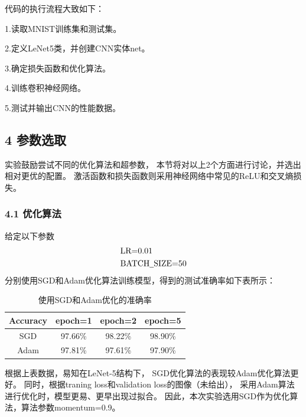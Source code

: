 \documentclass[a4paper,utf8]{article}
\begin{document}
	代码的执行流程大致如下：

	1.读取MNIST训练集和测试集。

	2.定义LeNet5类，并创建CNN实体net。

	3.确定损失函数和优化算法。

	4.训练卷积神经网络。

	5.测试并输出CNN的性能数据。


	\subsection*{4 参数选取}
	实验鼓励尝试不同的优化算法和超参数，
	本节将对以上2个方面进行讨论，并选出相对更优的配置。
	激活函数和损失函数则采用神经网络中常见的ReLU和交叉熵损失。

	\subsubsection*{4.1 优化算法}
	给定以下参数
	\begin{align*}
		& \text{LR=0.01} \\
		& \text{BATCH\underline{\hspace{0.5em}}SIZE=50}
	\end{align*}
	分别使用SGD和Adam优化算法训练模型，得到的测试准确率如下表所示：
	\begin{table}[h]
		\centering
		\label{tab:my_label}
		\begin{tabular}{|c|c|c|c|}
		   \hline
		   Accuracy & epoch=1 & epoch=2 & epoch=5 \\
		   \hline
		   SGD & 97.66\% & 98.22\% & 98.90\% \\
		   \hline
		   Adam & 97.81\% & 97.61\% & 97.90\% \\
		   \hline
		\end{tabular}
		\caption{使用SGD和Adam优化的准确率}
	\end{table}

	根据上表数据，易知在LeNet-5结构下，
	SGD优化算法的表现较Adam优化算法更好。
	同时，根据traning loss和validation loss的图像（未给出），
	采用Adam算法进行优化时，模型更易、更早出现过拟合。
	因此，本次实验选用SGD作为优化算法，算法参数momentum=0.9。
\end{document}
